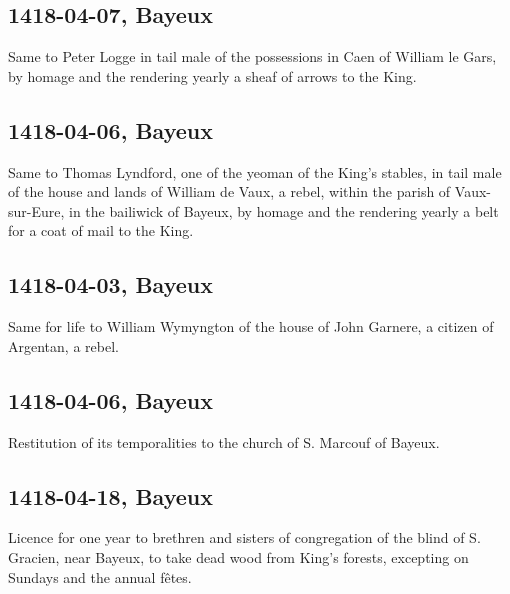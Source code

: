 \documentclass[a4paper,12pt,twoside]{book}
\begin{document}
            \subsection{1418-04-07, Bayeux}
            
                     Same to Peter Logge in tail male of the possessions in Caen of William le Gars, by homage and the rendering yearly a sheaf of arrows to the King.
                  
            \subsection{1418-04-06, Bayeux}
            
                     Same to Thomas Lyndford, one of the yeoman of the King's stables, in tail male of the house and lands of William de Vaux, a rebel, within the parish of Vaux-sur-Eure, in the bailiwick of Bayeux, by homage and the rendering yearly a belt for a coat of mail to the King.
                  
            \subsection{1418-04-03, Bayeux}
            
                     Same for life to William Wymyngton of the house of John Garnere, a citizen of Argentan, a rebel.
                  
            \subsection{1418-04-06, Bayeux}
            
                     Restitution of its temporalities to the church of S. Marcouf of Bayeux.
                  
            \subsection{1418-04-18, Bayeux}
            
                     Licence for one year to brethren and sisters of congregation of the blind of S. Gracien, near Bayeux, to take dead wood from King's forests, excepting on Sundays and the annual fêtes.
                  
\end{document}

